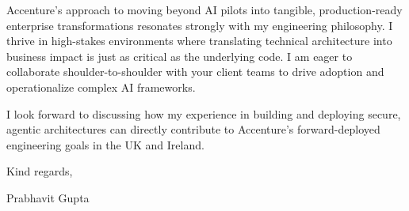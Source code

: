 \documentclass[11pt,a4paper]{article}
\begin{document}
\vspace{1em}
\noindent
Accenture's approach to moving beyond AI pilots into tangible, production-ready enterprise transformations resonates strongly with my engineering philosophy. I thrive in high-stakes environments where translating technical architecture into business impact is just as critical as the underlying code. I am eager to collaborate shoulder-to-shoulder with your client teams to drive adoption and operationalize complex AI frameworks.

\vspace{1em}
\noindent
I look forward to discussing how my experience in building and deploying secure, agentic architectures can directly contribute to Accenture's forward-deployed engineering goals in the UK and Ireland.

\vspace{1em}
\noindent
Kind regards,

\vspace{2em}
\noindent
Prabhavit Gupta
\end{document}
